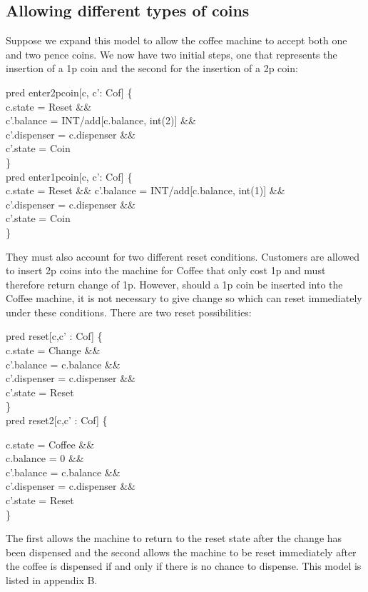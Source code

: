 \documentclass[a4paper,12pt]{extarticle}
\begin{document}
\subsection{Allowing different types of coins}
\label{Allowing different types coins}
Suppose we expand this model to allow the coffee machine to accept both one and    two pence coins. We now have two initial steps, one that represents the insertion of a 1p coin and the second for the insertion of a 2p coin:
\begin{algorithm}
pred enter2pcoin[c, c': Cof] \{\\

c.state = Reset \&\& \\
c'.balance = INT/add[c.balance, int(2)] \&\& \\
c'.dispenser = c.dispenser \&\& \\
c'.state = Coin\\

\}\\

pred enter1pcoin[c, c': Cof] \{ \\

c.state = Reset \&\&
c'.balance = INT/add[c.balance, int(1)] \&\& \\
c'.dispenser = c.dispenser \&\& \\
c'.state = Coin\\

\}
\end{algorithm}
They must also account for two different reset conditions. Customers are allowed to insert 2p coins into the machine for Coffee that only cost 1p and must therefore return change of 1p. However, should a 1p coin be inserted into the Coffee machine, it is not necessary to give change so which can reset immediately under these conditions. There are two reset possibilities:\\
\begin{algorithm}
pred reset[c,c' : Cof] \{\\

c.state = Change \&\& \\
c'.balance = c.balance \&\& \\
c'.dispenser = c.dispenser \&\& \\
c'.state = Reset\\

\}\\

pred reset2[c,c' : Cof] \{

c.state = Coffee \&\& \\
c.balance = 0 \&\& \\
c'.balance = c.balance \&\& \\
c'.dispenser = c.dispenser \&\& \\
c'.state = Reset\\

\}\\
\end{algorithm}
The first allows the machine to return to the reset state after the change has been dispensed and the second allows the machine to be reset immediately after the coffee is dispensed if and only if there is no chance to dispense. This model is listed in appendix B.
\end{document}
